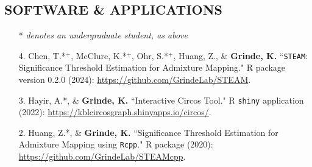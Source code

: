 \documentclass[margin]{res}
\begin{document}
\begin{resume}




\section{SOFTWARE \& APPLICATIONS} 

\begin{itemize}

\item[*] \textit{denotes an undergraduate student, as above}\\
\end{itemize}

\begin{itemize}
\item[4.] Chen, T.*$^{+}$, McClure, K.*$^{+}$, Ohr, S.*$^{+}$, Huang, Z., \& \textbf{Grinde, K.} ``\texttt{STEAM}: Significance Threshold Estimation for Admixture Mapping." R package version 0.2.0 (2024): \href{https://github.com/GrindeLab/STEAM}{https://github.com/GrindeLab/STEAM}.

\item[3.] Hayir, A.*, \& \textbf{Grinde, K.} ``Interactive Circos Tool." R \texttt{shiny} application (2022): \href{https://kblcircosgraph.shinyapps.io/circos/}{https://kblcircosgraph.shinyapps.io/circos/}.

\item[2.] Huang, Z.*, \& \textbf{Grinde, K.} ``Significance Threshold Estimation for Admixture Mapping using \texttt{Rcpp}." R package (2020): \href{https://github.com/GrindeLab/STEAMcpp}{https://github.com/GrindeLab/STEAMcpp}.


\end{itemize}
\end{resume}
\end{document}
